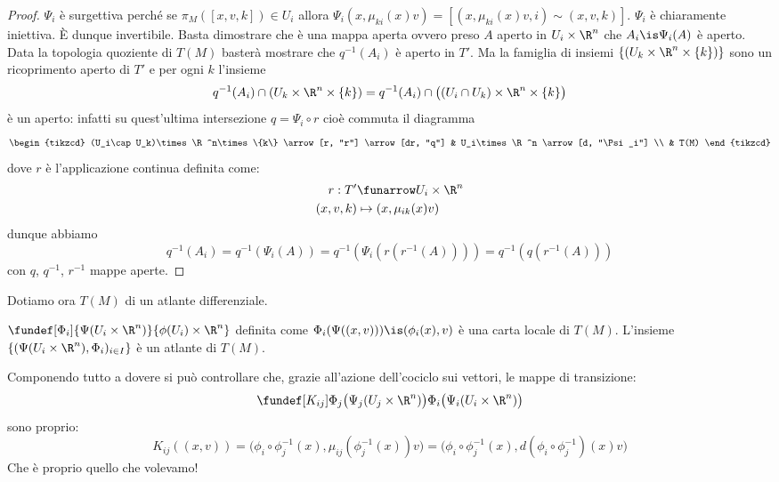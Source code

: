 \begin{proof}
	$\Psi_i$ è surgettiva perché
	se $\pi_M([x, v, k])\in U_i$
	allora $\Psi_i(x, \mu_{ki}(x)v)=[(x, \mu_{ki}(x)v, i)\sim (x, v, k)]$.
	$\Psi_i$ è chiaramente iniettiva.
	È dunque invertibile.
	Basta dimostrare che è una mappa aperta
	ovvero preso $A$ aperto in $U_i\times \R^n$
	che $A_i\is\Psi_i(A)$ è aperto.
	Data la topologia quoziente di $T(M)$
	basterà mostrare che $q^{-1}(A_i)$ è aperto in $T'$.
	Ma la famiglia di insiemi $\{(U_k\times \R^n\times\{k\})\}$
	sono un ricoprimento aperto di $T'$
	e per ogni $k$ l'insieme
	\[q^{-1}(A_i)\cap (U_k\times \R^n\times\{k\}) =
	q^{-1}(A_i)\cap\big((U_i\cap U_k)\times \R^n\times\{k\}\big)\]
	è un aperto:
	infatti su quest'ultima intersezione $q=\Psi_i\circ r $
	cioè commuta il diagramma
	\begin{equation*}
		\begin{tikzcd}
			(U_i\cap U_k)\times \R^n\times\{k\} \arrow[r, "r"] \arrow[dr, "q"]
			& U_i\times\R^n \arrow[d, "\Psi_i"] \\
			& T(M)
		\end{tikzcd}
	\end{equation*}
	dove $r$ è l'applicazione continua definita come:
	\begin{align*}
		r : T' & \funarrow U_i\times\R^n \\
		(x,v,k) & \mapsto (x, \mu_{ik}(x)v)
	\end{align*}
	dunque abbiamo
	\[q^{-1}(A_i)=
	q^{-1}(\Psi_i(A))=
	q^{-1}(\Psi_i(r(r^{-1}(A))))=
	q^{-1}(q(r^{-1}(A)))\]
	con $q$, $q^{-1}$, $r^{-1}$ mappe aperte.
\end{proof}

Dotiamo ora $T(M)$ di un atlante differenziale.
\begin{defn}[Carte di $T(M)$]
$\fundef[\Phi_i]{\Psi(U_i\times \R^n)}{\phi(U_i)\times \R^n}$ definita come $\Phi_i(\Psi((x, v)))\is(\phi_i(x),v)$ è una carta locale di $T(M)$. L'insieme $\{(\Psi(U_i\times\R^n), \Phi_i)_{i\in I}\}$ è un atlante di $T(M)$.
\end{defn}

Componendo tutto a dovere si può controllare che, grazie all'azione dell'cociclo sui vettori, le mappe di transizione:
\begin{equation*}
\fundef[K_{ij}]{\Phi_j\big(\Psi_j(U_j\times\R^n)\big)}{\Phi_i\big(\Psi_i(U_i\times\R^n)\big)} 
\end{equation*}
sono proprio:
\begin{equation*}
K_{ij}((x, v))= \big(\phi_i\circ\phi_j^{-1}(x), \mu_{ij}(\phi_j^{-1}(x))v\big)=\big(\phi_i\circ\phi_j^{-1}(x), d(\phi_i\circ\phi_j^{-1})(x)v\big)
\end{equation*}
Che è proprio quello che volevamo!

